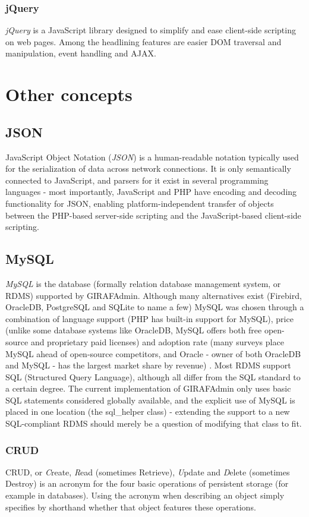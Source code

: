 \subsubsection*{jQuery}
\emph{jQuery} is a JavaScript library designed to simplify and ease client-side scripting on web pages. Among the headlining features are easier DOM traversal and manipulation, event handling and AJAX.

\section{Other concepts}

\subsection*{JSON}
JavaScript Object Notation (\emph{JSON}) is a human-readable notation typically used for the serialization of data across network connections. It is only semantically connected to JavaScript, and parsers for it exist in several programming languages - most importantly, JavaScript and PHP have encoding and decoding functionality for JSON, enabling platform-independent transfer of objects between the PHP-based server-side scripting and the JavaScript-based client-side scripting.

\subsection*{MySQL}
\emph{MySQL} is the database (formally relation database management system, or RDMS) supported by GIRAFAdmin. Although many alternatives exist (Firebird, OracleDB, PostgreSQL and SQLite to name a few) MySQL was chosen through a combination of language support (PHP has built-in support for MySQL), price (unlike some database systems like OracleDB, MySQL offers both free open-source and proprietary paid licenses) and adoption rate (many surveys place MySQL ahead of open-source competitors, and Oracle - owner of both OracleDB and MySQL - has the largest market share by revenue) \cite{mysqlpenetration}\cite{mysqlmarketshare}. Most RDMS support SQL (Structured Query Language), although all differ from the SQL standard to a certain degree. The current implementation of GIRAFAdmin only uses basic SQL statements considered globally available, and the explicit use of MySQL is placed in one location (the sql\_helper class) - extending the support to a new SQL-compliant RDMS should merely be a question of modifying that class to fit.

\subsubsection*{CRUD}
\label{CRUD}
CRUD, or \emph{C}reate, \emph{R}ead (sometimes Retrieve), \emph{U}pdate and \emph{D}elete (sometimes Destroy) is an acronym for the four basic operations of persistent storage (for example in databases). Using the acronym when describing an object simply specifies by shorthand whether that object features these operations.